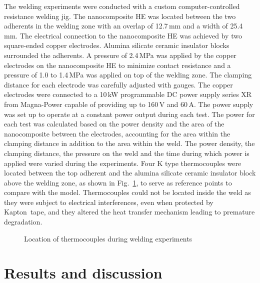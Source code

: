 The welding experiments were conducted with a custom computer-controlled resistance welding jig. 
The nanocomposite HE was located between the two adherents in the welding zone with an overlap of \mbox{12.7\,mm} and a width of \mbox{25.4\,mm}. 
The electrical connection to the nanocomposite HE was achieved by two square-ended copper electrodes. 
Alumina silicate ceramic insulator blocks surrounded the adherents. 
A pressure of \mbox{2.4\,MPa} was applied by the copper electrodes on the nanocomposite HE to minimize contact resistance and a pressure of 1.0 to \mbox{1.4\,MPa} was applied on top of the welding zone. 
The clamping distance for each electrode was carefully adjusted with gauges. 
The copper electrodes were connected to a \mbox{10\,kW} programmable DC power supply series XR from Magna-Power capable of providing up to \mbox{160\,V} and \mbox{60\,A}. 
The power supply was set up to operate at a constant power output during each test. 
The power for each test was calculated based on the power density and the area of the nanocomposite between the electrodes, accounting for the area within the clamping distance in addition to the area within the weld. 
The power density, the clamping distance, the pressure on the weld and the time during which power is applied were varied during the experiments. 
Four K type thermocouples were located between the top adherent and the alumina silicate ceramic insulator block above the welding zone, as shown in \mbox{Fig.~\ref{fig:2_Fig3}}, to serve as reference points to compare with the model. 
Thermocouples could not be located inside the weld as they were subject to electrical interferences, even when protected by Kapton\textregistered \ tape, and they altered the heat transfer mechanism leading to premature degradation.  

\begin{figure}[ht]
	\centering
	\resizebox{0.75\textwidth}{!}{
	}
	\caption{Location of thermocouples during welding experiments}
	\label{fig:2_Fig3}
\end{figure} 

\FloatBarrier
\section{Results and discussion}

